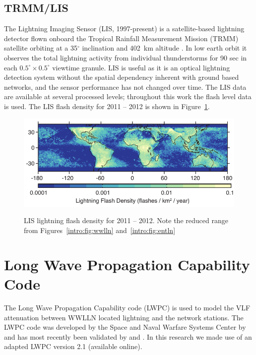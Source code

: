 \subsection{TRMM/LIS}

The Lightning Imaging Sensor (LIS, 1997-present) is a satellite-based lightning detector flown onboard the Tropical Rainfall Measurement Mission (TRMM) satellite orbiting at a 35$^\circ$ inclination and 402~km altitude \citep{Christian1999}.
In low earth orbit it observes the total lightning activity from individual thunderstorms for 90 sec in each $0.5^\circ \times 0.5^\circ$ viewtime granule.
LIS is useful as it is an optical lightning detection system without the spatial dependency inherent with ground based networks, and the sensor performance has not changed over time.
The LIS data are available at several processed levels; throughout this work the flash level data is used.
The LIS flash density for 2011 -- 2012 is shown in Figure~\ref{intro:fig:lis}.

\begin{figure}[ht!]
	\centering
	\includegraphics[scale=1]{Introduction/Figures/lis_density.pdf}\\
	\caption{LIS lightning flash density for 2011 -- 2012.
		     Note the reduced range from Figures~\ref{intro:fig:wwlln} and~\ref{intro:fig:entln}}
	\label{intro:fig:lis}
\end{figure}

\section{Long Wave Propagation Capability Code}
\label{intro:sec:lwpc}

The Long Wave Propagation Capability code (LWPC) is used to model the VLF attenuation between WWLLN located lightning and the network stations.
The LWPC code was developed by the Space and Naval Warfare Systems Center by \citet{Ferguson1998} and has most recently been validated by \citet{McRae2000d} and \citet{Thomson2011}.
In this research we made use of an adapted LWPC version 2.1 (available online).

